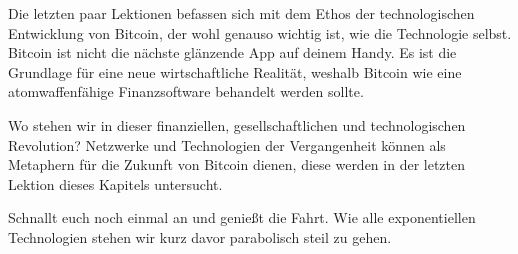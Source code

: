 Die letzten paar Lektionen befassen sich mit dem Ethos der technologischen
Entwicklung von Bitcoin, der wohl genauso wichtig ist, wie die Technologie
selbst. Bitcoin ist nicht die nächste glänzende App auf deinem Handy. Es ist die
Grundlage für eine neue wirtschaftliche Realität, weshalb Bitcoin wie eine
atomwaffenfähige Finanzsoftware behandelt werden sollte.

Wo stehen wir in dieser finanziellen, gesellschaftlichen und technologischen
Revolution? Netzwerke und Technologien der Vergangenheit können als Metaphern
für die Zukunft von Bitcoin dienen, diese werden in der letzten Lektion dieses
Kapitels untersucht.

Schnallt euch noch einmal an und genießt die Fahrt. Wie alle exponentiellen
Technologien stehen wir kurz davor parabolisch steil zu gehen.
